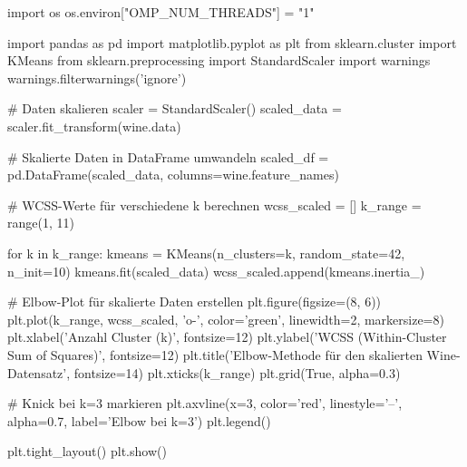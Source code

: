 import os
os.environ["OMP_NUM_THREADS"] = "1"

import pandas as pd
import matplotlib.pyplot as plt
from sklearn.cluster import KMeans
from sklearn.preprocessing import StandardScaler
import warnings
warnings.filterwarnings('ignore')

# Daten skalieren
scaler = StandardScaler()
scaled_data = scaler.fit_transform(wine.data)

# Skalierte Daten in DataFrame umwandeln
scaled_df = pd.DataFrame(scaled_data, columns=wine.feature_names)

# WCSS-Werte für verschiedene k berechnen
wcss_scaled = []
k_range = range(1, 11)

for k in k_range:
    kmeans = KMeans(n_clusters=k, random_state=42, n_init=10)
    kmeans.fit(scaled_data)
    wcss_scaled.append(kmeans.inertia_)

# Elbow-Plot für skalierte Daten erstellen
plt.figure(figsize=(8, 6))
plt.plot(k_range, wcss_scaled, 'o-', color='green', linewidth=2, markersize=8)
plt.xlabel('Anzahl Cluster (k)', fontsize=12)
plt.ylabel('WCSS (Within-Cluster Sum of Squares)', fontsize=12)
plt.title('Elbow-Methode für den skalierten Wine-Datensatz', fontsize=14)
plt.xticks(k_range)
plt.grid(True, alpha=0.3)

# Knick bei k=3 markieren
plt.axvline(x=3, color='red', linestyle='--', alpha=0.7, label='Elbow bei k=3')
plt.legend()

plt.tight_layout()
plt.show()